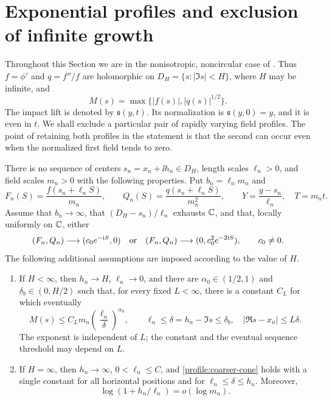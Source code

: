 \section{Exponential profiles and exclusion of infinite growth}
\label{sec:profiles}

Throughout this Section we are in the nonisotropic, noncircular case of
. Thus \(f=\phi'\) and \(q=f''/f\) are holomorphic
on \(D_H=\{s:|\Im s|<H\}\), where \(H\) may be infinite, and
\[
 M(s)=\max\{|f(s)|,|q(s)|^{1/2}\}.
\]
The impact lift is denoted by \(\mathfrak s(y,t)\). Its normalization is
\(\mathfrak s(y,0)=y\), and it is even in \(t\). We shall exclude a
particular pair of rapidly varying field profiles. The point of retaining
both profiles in the statement is that the second can occur even when
the normalized first field tends to zero.

\begin{theorem}
\label{thm:exponential-obstruction}
There is no sequence of centers \(s_n=x_n+\ii h_n\in D_H\), length scales
\(\ell_n>0\), and field scales \(m_n>0\) with the following properties.
Put \(b_n=\ell_nm_n\) and
\begin{equation}
 \label{profile:scales}
 F_n(S)=\frac{f(s_n+\ell_n S)}{m_n},\qquad
 Q_n(S)=\frac{q(s_n+\ell_n S)}{m_n^2},\qquad
 Y=\frac{y-s_n}{\ell_n},\quad T=m_nt.
\end{equation}
Assume that \(b_n\to\infty\), that \((D_H-s_n)/\ell_n\) exhausts
\(\mathbb C\), and that, locally uniformly on \(\mathbb C\), either
\begin{equation}
 \label{profile:exponential-pairs}
 (F_n,Q_n)\longrightarrow(c_0e^{-\mathrm i S},0)
 \quad\hbox{or}\quad
 (F_n,Q_n)\longrightarrow(0,c_0^2e^{-2\mathrm i S}),
 \qquad c_0\ne0.
\end{equation}
The following additional assumptions are imposed according to the value
of \(H\).
\begin{enumerate}[label=\textnormal{(\roman*)}]
 \item If \(H<\infty\), then \(h_n\to H\), \(\ell_n\to0\), and
 there are \(\alpha_0\in(1/2,1)\) and
 \(\delta_b\in(0,H/2)\) such that, for every fixed \(L<\infty\),
 there is a constant \(C_L\) for which eventually
 \begin{equation}
  \label{profile:coarser-cone}
  M(s)\le C_Lm_n\left(\frac{\ell_n}{\delta}\right)^{\alpha_0},
  \qquad
  \ell_n\le\delta=h_n-\Im s\le\delta_b,
  \quad |\Re s-x_n|\le L\delta.
 \end{equation}
 The exponent is independent of \(L\); the constant and the eventual
 sequence threshold may depend on \(L\).
 \item If \(H=\infty\), then \(h_n\to\infty\),
 \(0<\ell_n\le C\), and \eqref{profile:coarser-cone} holds with a
 single constant for all horizontal positions and for
 \(\ell_n\le\delta\le h_n\). Moreover,
 \begin{equation}
  \label{profile:entire-log-condition}
  \log(1+h_n/\ell_n)=o(\log m_n).
 \end{equation}
\end{enumerate}
\end{theorem}

